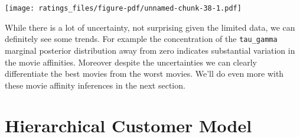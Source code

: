 \documentclass[
  letterpaper,
  DIV=11,
  numbers=noendperiod]{scrartcl}
\newenvironment{Shaded}{\begin{snugshade}}{\end{snugshade}}
\newcommand{\AttributeTok}[1]{\textcolor[rgb]{0.40,0.45,0.13}{#1}}
\newcommand{\ControlFlowTok}[1]{\textcolor[rgb]{0.00,0.23,0.31}{#1}}
\newcommand{\DecValTok}[1]{\textcolor[rgb]{0.68,0.00,0.00}{#1}}
\newcommand{\FunctionTok}[1]{\textcolor[rgb]{0.28,0.35,0.67}{#1}}
\newcommand{\NormalTok}[1]{\textcolor[rgb]{0.00,0.23,0.31}{#1}}
\newcommand{\OtherTok}[1]{\textcolor[rgb]{0.00,0.23,0.31}{#1}}
\newcommand{\SpecialCharTok}[1]{\textcolor[rgb]{0.37,0.37,0.37}{#1}}
\newcommand{\StringTok}[1]{\textcolor[rgb]{0.13,0.47,0.30}{#1}}
\begin{document}
\begin{Shaded}
\end{Shaded}

\texttt{[image: ratings\_files/figure-pdf/unnamed-chunk-38-1.pdf]}

While there is a lot of uncertainty, not surprising given the limited
data, we can definitely see some trends. For example the concentration
of the \texttt{tau\_gamma} marginal posterior distribution away from
zero indicates substantial variation in the movie affinities. Moreover
despite the uncertainties we can clearly differentiate the best movies
from the worst movies. We'll do even more with these movie affinity
inferences in the next section.

\section{Hierarchical Customer Model}\label{hierarchical-customer-model}
\end{document}
